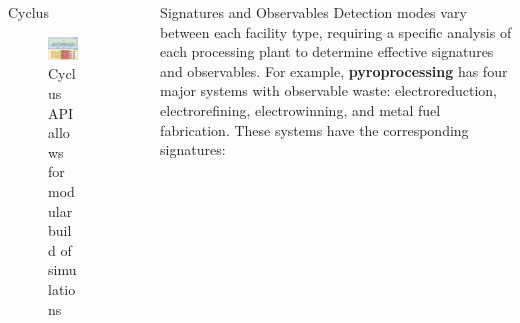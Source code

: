 \documentclass[final]{beamer}
\newlength{\sepwid}
\newlength{\onecolwid}
\newlength{\threecolwid}
\begin{document}
\begin{frame}[t]
\begin{columns}[t,totalwidth=\threecolwid]
\begin{column}{\onecolwid}
\begin{block}{Cyclus}\end{block}

	\begin{figure}
		\includegraphics[width=0.9\linewidth]{Cyclus_graph}
		\caption{Cyclus API allows for modular build of simulations \cite{huff_2018}}
	\end{figure}



\end{column} %

\begin{column}{\sepwid}\end{column} %



\begin{column}{\onecolwid} %

\begin{block}{Signatures and Observables}
        Detection modes vary between each facility type, requiring a specific 
        analysis of each processing plant to determine effective signatures and 
        observables. For example, \textbf{pyroprocessing} has four major 
        systems with observable waste: electroreduction, electrorefining, electrowinning, and metal fuel fabrication\cite{Borrelli_2017}.
        These systems have the corresponding signatures:
        

\end{block}
\end{column}
\end{columns}
\end{frame}
\end{document}
